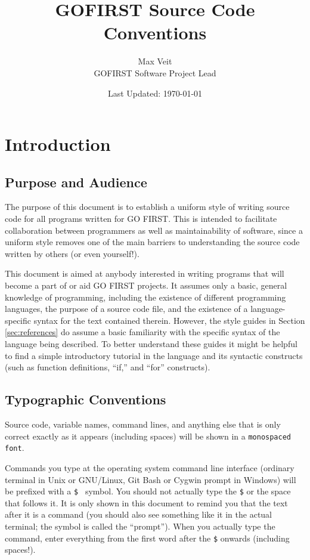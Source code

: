 \documentclass[12pt]{article}
\newcommand{\commandline}[1]{\texttt{\$ #1}}
\begin{document}
\title{GOFIRST Source Code Conventions}
\author{Max Veit\\
GOFIRST Software Project Lead}
\date{Last Updated: \today}

\maketitle
\tableofcontents
\thispagestyle{fancy}

\section{Introduction}
\subsection{Purpose and Audience}
The purpose of this document is to establish a uniform style of writing source code for all programs written for GO FIRST. This is intended to facilitate collaboration between programmers as well as maintainability of software, since a uniform style removes one of the main barriers to understanding the source code written by others (or even yourself!). 

This document is aimed at anybody interested in writing programs that will become a part of or aid GO FIRST projects. It assumes only a basic, general knowledge of programming, including the existence of different programming languages, the purpose of a source code file, and the existence of a language-specific syntax for the text contained therein. However, the style guides in Section \ref{sec:references} do assume a basic familiarity with the specific syntax of the language being described. To better understand these guides it might be helpful to find a simple introductory tutorial in the language and its syntactic constructs (such as function definitions, ``if,'' and ``for'' constructs).

\subsection{Typographic Conventions}
Source code, variable names, command lines, and anything else that is only correct exactly as it appears (including spaces) will be shown in a \texttt{monospaced font}.

Commands you type at the operating system command line interface (ordinary terminal in Unix or GNU/Linux, Git Bash or Cygwin prompt in Windows) will be prefixed with a \commandline{} symbol. You should not actually type the \texttt{\$} or the space that follows it. It is only shown in this document to remind you that the text after it is a command (you should also see something like it in the actual terminal; the symbol is called the ``prompt''). When you actually type the command, enter everything from the first word after the \texttt{\$} onwards (including spaces!).
\end{document}
